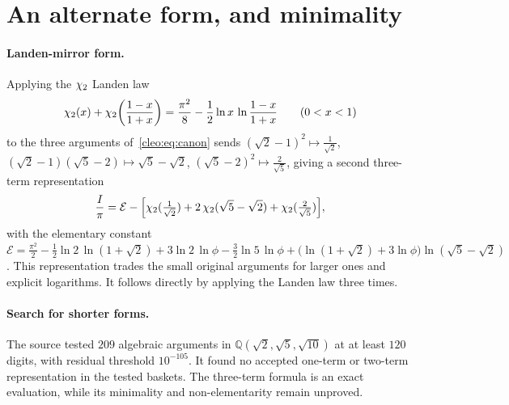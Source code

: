 \section{An alternate form, and minimality}\label{cleo:sec:minimal}
\paragraph{Landen-mirror form.} Applying the $\chi_2$ Landen law
\begin{equation}\label{cleo:eq:landen}
  \chi_2(x)+\chi_2\!\left(\frac{1-x}{1+x}\right)=\frac{\pi^2}{8}-\frac12\ln x\,\ln\frac{1-x}{1+x}
  \qquad(0<x<1)
\end{equation}
to the three arguments of~\eqref{cleo:eq:canon} sends $(\sqrt2-1)^2\mapsto\tfrac1{\sqrt2}$,
$(\sqrt2-1)(\sqrt5-2)\mapsto\sqrt5-\sqrt2$, $(\sqrt5-2)^2\mapsto\tfrac2{\sqrt5}$, giving a second three-term
representation
\begin{equation}\label{cleo:eq:mirror}
  \frac{I}{\pi}=\mathcal E-\Bigl[\chi_2(\tfrac1{\sqrt2})+2\,\chi_2(\sqrt5-\sqrt2)+\chi_2(\tfrac2{\sqrt5})\Bigr],
\end{equation}
with the elementary constant
$\mathcal E=\frac{\pi^2}{2}-\frac12\ln2\,\ln(1+\sqrt2)+3\ln2\,\ln\phi-\frac32\ln5\,\ln\phi
+\bigl(\ln(1+\sqrt2)+3\ln\phi\bigr)\ln(\sqrt5-\sqrt2)$.
This representation trades the small original arguments for larger ones
and explicit logarithms. It follows directly by applying the Landen law
three times.

\paragraph{Search for shorter forms.}
The source tested $209$ algebraic arguments in
$\mathbb Q(\sqrt2,\sqrt5,\sqrt{10})$ at at least $120$ digits, with
residual threshold $10^{-105}$. It found no accepted one-term or two-term
representation in the tested baskets. The three-term formula is an exact
evaluation, while its minimality and non-elementarity remain unproved.

